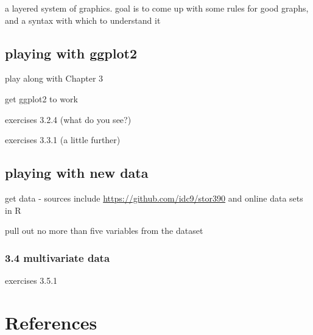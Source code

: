 \documentclass[]{book}
\theoremstyle{definition}
\theoremstyle{definition}
\theoremstyle{definition}
\theoremstyle{remark}
\begin{document}
a layered system of graphics. goal is to come up with some rules for
good graphs, and a syntax with which to understand it

\section{playing with ggplot2}\label{playing-with-ggplot2}

play along with Chapter 3

get ggplot2 to work

exercises 3.2.4 (what do you see?)

exercises 3.3.1 (a little further)

\section{playing with new data}\label{playing-with-new-data}

get data - sources include \url{https://github.com/idc9/stor390} and
online data sets in R

pull out no more than five variables from the dataset

\subsection{3.4 multivariate data}\label{multivariate-data}

exercises 3.5.1

\chapter{References}\label{references}


\end{document}
